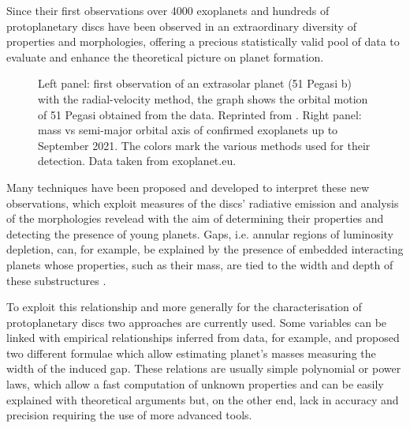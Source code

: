 \documentclass[a4paper,10pt]{report}
\begin{document}
Since their first observations over 4000 exoplanets and hundreds of protoplanetary discs have been observed in an extraordinary 
diversity of properties and morphologies, 
offering a precious statistically valid pool of data to evaluate and enhance
the theoretical picture on planet formation.

\begin{figure}
    \begin{center}
    \scalebox{0.78}{}
    \end{center}
    \caption{Left panel: first observation of an extrasolar planet (51 Pegasi b) with the radial-velocity method, the graph shows the orbital motion 
    of 51 Pegasi obtained from the data. Reprinted from \citet{Mayor1995}. Right panel:
    mass vs semi-major orbital axis of confirmed exoplanets up to September 2021. The colors 
    mark the various methods used for their detection. Data taken from exoplanet.eu.}
\end{figure}

Many techniques have been proposed and developed to interpret these new observations,
which exploit measures of the discs' radiative emission and analysis of the morphologies revelead
with the aim of determining their properties and detecting the presence of young planets.
Gaps, i.e. annular regions of luminosity depletion, can, for example, be explained 
by the presence of embedded interacting planets whose properties, such as their mass, are
tied to the width and depth of these substructures \citep{gap_opening1,gap_opening2,gap_opening3}.

To exploit this relationship and more generally for the characterisation of protoplanetary discs
two approaches are currently used. Some variables can be linked with empirical relationships 
inferred from data,
for example, \citet{Lodato_2019} and \citet{kanagawa} proposed 
two different formulae which allow estimating planet's masses measuring
the width of the induced gap. These relations are usually simple polynomial or power laws, which 
allow a fast computation of unknown properties and can be easily explained with theoretical
arguments but, on the other end,
lack in accuracy and precision requiring the use of more advanced tools.
\end{document}
